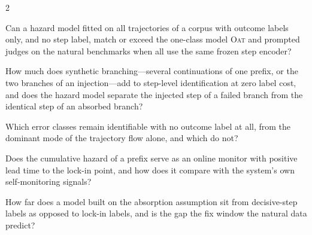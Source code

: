 \documentclass[10pt,a4paper]{article}
\begin{document}
\begin{rqbox}{2}
\begin{description}[leftmargin=3.2em,style=sameline,font=\bfseries,itemsep=1.5pt]
\item[RQ\,2.1] Can a hazard model fitted on all trajectories of a corpus with outcome labels only, and no step label, match or exceed the one-class model \textsc{Oat} and prompted judges on the natural benchmarks when all use the same frozen step encoder?
\item[RQ\,2.2] How much does synthetic branching---several continuations of one prefix, or the two branches of an injection---add to step-level identification at zero label cost, and does the hazard model separate the injected step of a failed branch from the identical step of an absorbed branch?
\item[RQ\,2.3] Which error classes remain identifiable with no outcome label at all, from the dominant mode of the trajectory flow alone, and which do not?
\item[RQ\,2.4] Does the cumulative hazard of a prefix serve as an online monitor with positive lead time to the lock-in point, and how does it compare with the system's own self-monitoring signals?
\item[RQ\,2.5] How far does a model built on the absorption assumption sit from decisive-step labels as opposed to lock-in labels, and is the gap the fix window the natural data predict?
\end{description}
\end{rqbox}
\end{document}
